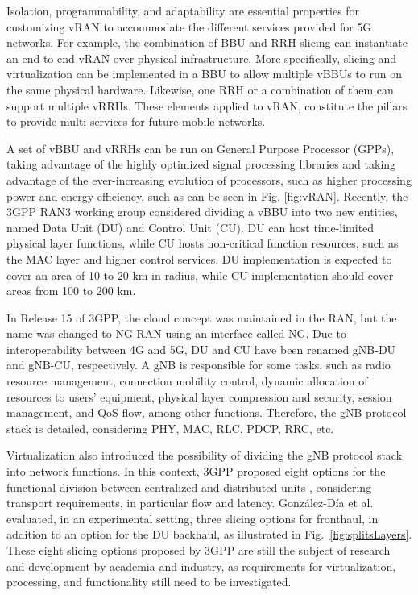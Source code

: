 Isolation, programmability, and adaptability are essential properties for customizing vRAN to accommodate the different services provided for 5G networks. For example, the combination of BBU and RRH slicing can instantiate an end-to-end vRAN over physical infrastructure. More specifically, slicing and virtualization can be implemented in a BBU to allow multiple vBBUs to run on the same physical hardware. Likewise, one RRH or a combination of them can support multiple vRRHs. These elements applied to vRAN, constitute the pillars to provide multi-services for future mobile networks.

A set of vBBU and vRRHs can be run on General Purpose Processor (GPPs), taking advantage of the highly optimized signal processing libraries and taking advantage of the ever-increasing evolution of processors, such as higher processing power and energy efficiency, such as can be seen in Fig. \ref{fig:vRAN}. Recently, the 3GPP RAN3 working group \cite{3gpp:TR38.801} considered dividing a vBBU into two new entities, named Data Unit (DU) and Control Unit (CU). DU can host time-limited physical layer functions, while CU hosts non-critical function resources, such as the MAC layer and higher control services. DU implementation is expected to cover an area of 10 to 20 km in radius, while CU implementation should cover areas from 100 to 200 km.

In Release 15 of 3GPP, the cloud concept was maintained in the RAN, but the name was changed to NG-RAN using an interface called NG. Due to interoperability between 4G and 5G, DU and CU have been renamed gNB-DU and gNB-CU, respectively. A gNB is responsible for some tasks, such as radio resource management, connection mobility control, dynamic allocation of resources to users' equipment, physical layer compression and security, session management, and QoS flow, among other functions. Therefore, the gNB protocol stack is detailed, considering PHY, MAC, RLC, PDCP, RRC, etc.

Virtualization also introduced the possibility of dividing the gNB protocol stack into network functions. In this context, 3GPP proposed eight options for the functional division between centralized and distributed units \cite{3gpp:TR38.801}, considering transport requirements, in particular flow and latency. González-Día et al. ~\cite{Gonzalez-Diaz:19} evaluated, in an experimental setting, three slicing options for fronthaul, in addition to an option for the DU backhaul, as illustrated in Fig.~\ref{fig:splitsLayers}. These eight slicing options proposed by 3GPP are still the subject of research ~\cite{fonseca-sbrc-2019} and development by academia and industry, as requirements for virtualization, processing, and functionality still need to be investigated.

